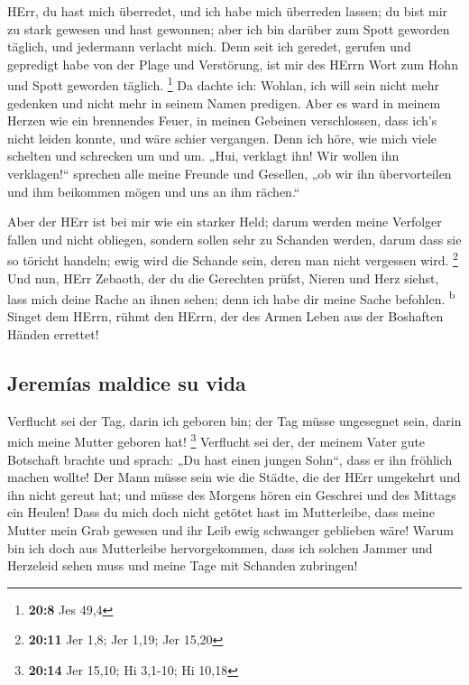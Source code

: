 HErr, du hast mich überredet, und ich habe mich überreden
lassen; du bist mir zu stark gewesen und hast gewonnen; aber ich bin
darüber zum Spott geworden täglich, und jedermann verlacht mich.
 Denn seit ich geredet, gerufen und gepredigt habe von der
Plage und Verstörung, ist mir des HErrn Wort zum Hohn und Spott geworden
täglich. \footnote{\textbf{20:8} Jes 49,4}  Da dachte ich:
Wohlan, ich will sein nicht mehr gedenken und nicht mehr in seinem Namen
predigen. Aber es ward in meinem Herzen wie ein brennendes Feuer, in
meinen Gebeinen verschlossen, dass ich's nicht leiden konnte, und wäre
schier vergangen.  Denn ich höre, wie mich viele schelten
und schrecken um und um. „Hui, verklagt ihn! Wir wollen ihn
verklagen!{}`` sprechen alle meine Freunde und Gesellen, „ob wir ihn
übervorteilen und ihm beikommen mögen und uns an ihm rächen.``

 Aber der HErr ist bei mir wie ein starker Held; darum
werden meine Verfolger fallen und nicht obliegen, sondern sollen sehr zu
Schanden werden, darum dass sie so töricht handeln; ewig wird die
Schande sein, deren man nicht vergessen wird. \footnote{\textbf{20:11}
  Jer 1,8; Jer 1,19; Jer 15,20}  Und nun, HErr Zebaoth,
der du die Gerechten prüfst, Nieren und Herz siehst, lass mich deine
Rache an ihnen sehen; denn ich habe dir meine Sache befohlen.
\textsuperscript{b}  Singet dem HErrn, rühmt den HErrn,
der des Armen Leben aus der Boshaften Händen errettet!

\hypertarget{jeremuxedas-maldice-su-vida}{%
\subsection{Jeremías maldice su
vida}\label{jeremuxedas-maldice-su-vida}}

 Verflucht sei der Tag, darin ich geboren bin; der Tag
müsse ungesegnet sein, darin mich meine Mutter geboren hat! \footnote{\textbf{20:14}
  Jer 15,10; Hi 3,1-10; Hi 10,18}  Verflucht sei der, der
meinem Vater gute Botschaft brachte und sprach: „Du hast einen jungen
Sohn``, dass er ihn fröhlich machen wollte!  Der Mann
müsse sein wie die Städte, die der HErr umgekehrt und ihn nicht gereut
hat; und müsse des Morgens hören ein Geschrei und des Mittags ein
Heulen!  Dass du mich doch nicht getötet hast im
Mutterleibe, dass meine Mutter mein Grab gewesen und ihr Leib ewig
schwanger geblieben wäre!  Warum bin ich doch aus
Mutterleibe hervorgekommen, dass ich solchen Jammer und Herzeleid sehen
muss und meine Tage mit Schanden zubringen!


